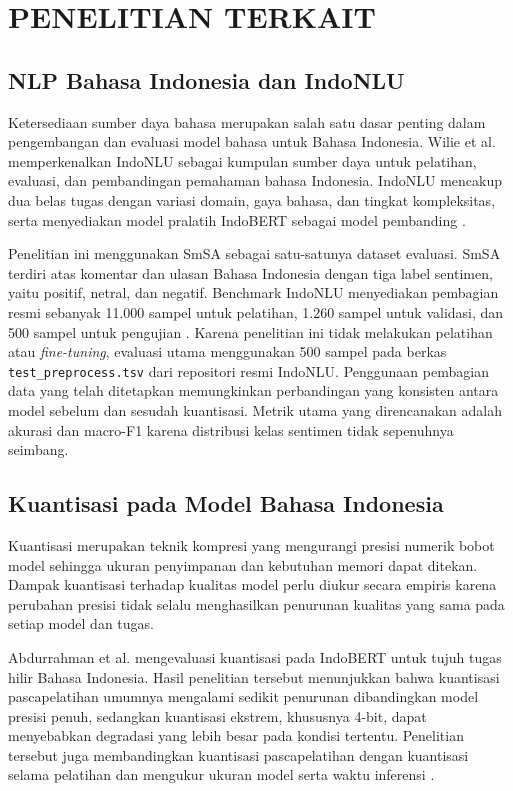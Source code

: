\chapter{PENELITIAN TERKAIT}

\section{NLP Bahasa Indonesia dan IndoNLU}

Ketersediaan sumber daya bahasa merupakan salah satu dasar penting dalam pengembangan dan evaluasi model bahasa untuk Bahasa Indonesia. Wilie et al. memperkenalkan IndoNLU sebagai kumpulan sumber daya untuk pelatihan, evaluasi, dan pembandingan pemahaman bahasa Indonesia. IndoNLU mencakup dua belas tugas dengan variasi domain, gaya bahasa, dan tingkat kompleksitas, serta menyediakan model pralatih IndoBERT sebagai model pembanding \citep{wilie2020indonlu}.

Penelitian ini menggunakan SmSA sebagai satu-satunya dataset evaluasi. SmSA terdiri atas komentar dan ulasan Bahasa Indonesia dengan tiga label sentimen, yaitu positif, netral, dan negatif. Benchmark IndoNLU menyediakan pembagian resmi sebanyak 11.000 sampel untuk pelatihan, 1.260 sampel untuk validasi, dan 500 sampel untuk pengujian \citep{wilie2020indonlu}. Karena penelitian ini tidak melakukan pelatihan atau \textit{fine-tuning}, evaluasi utama menggunakan 500 sampel pada berkas \texttt{test\_preprocess.tsv} dari repositori resmi IndoNLU. Penggunaan pembagian data yang telah ditetapkan memungkinkan perbandingan yang konsisten antara model sebelum dan sesudah kuantisasi. Metrik utama yang direncanakan adalah akurasi dan macro-F1 karena distribusi kelas sentimen tidak sepenuhnya seimbang.

\section{Kuantisasi pada Model Bahasa Indonesia}

Kuantisasi merupakan teknik kompresi yang mengurangi presisi numerik bobot model sehingga ukuran penyimpanan dan kebutuhan memori dapat ditekan. Dampak kuantisasi terhadap kualitas model perlu diukur secara empiris karena perubahan presisi tidak selalu menghasilkan penurunan kualitas yang sama pada setiap model dan tugas.

Abdurrahman et al. mengevaluasi kuantisasi pada IndoBERT untuk tujuh tugas hilir Bahasa Indonesia. Hasil penelitian tersebut menunjukkan bahwa kuantisasi pascapelatihan umumnya mengalami sedikit penurunan dibandingkan model presisi penuh, sedangkan kuantisasi ekstrem, khususnya 4-bit, dapat menyebabkan degradasi yang lebih besar pada kondisi tertentu. Penelitian tersebut juga membandingkan kuantisasi pascapelatihan dengan kuantisasi selama pelatihan dan mengukur ukuran model serta waktu inferensi \citep{abdurrahman2023indobert}.


